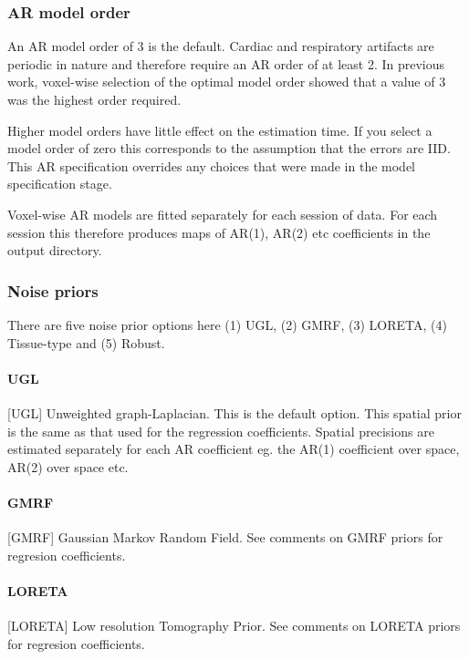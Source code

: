 \subsubsection{AR model order}

An AR model order of 3 is the default. Cardiac and respiratory artifacts are periodic in nature and therefore require an AR order of at least 2. In previous work, voxel-wise selection of the optimal model order showed that a value of 3 was the highest order required. 

Higher model orders have little effect on the estimation time. If you select a model order of zero this corresponds to the assumption that the errors are IID. This AR specification overrides any choices that were made in the model specification stage.

Voxel-wise AR models are fitted separately for each session of data. For each session this therefore produces maps of AR(1), AR(2) etc coefficients in the output directory.

\subsubsection{Noise priors}

There are five noise prior options here (1) UGL, (2) GMRF, (3) LORETA, (4) Tissue-type and (5) Robust.

\paragraph{UGL}

[UGL] Unweighted graph-Laplacian. This is the default option. This spatial prior is the same as that used for the regression coefficients. Spatial precisions are estimated separately for each AR coefficient eg. the AR(1) coefficient over space, AR(2) over space etc. 

\paragraph{GMRF}

[GMRF] Gaussian Markov Random Field. See comments on GMRF priors for regresion coefficients.

\paragraph{LORETA}

[LORETA] Low resolution Tomography Prior. See comments on LORETA priors for regresion coefficients.

